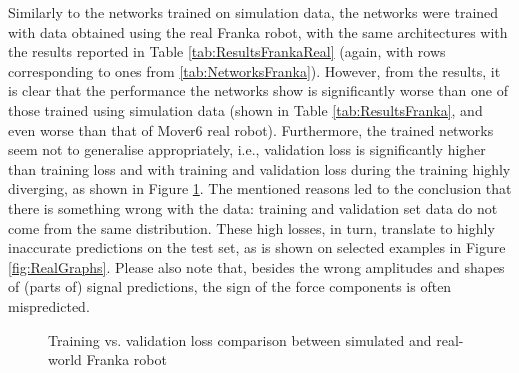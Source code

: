 Similarly to the networks trained on simulation data, the networks were trained with data obtained using the real Franka robot, with the same architectures with the results reported in Table \ref{tab:ResultsFrankaReal} (again, with rows corresponding to ones from \cref{tab:NetworksFranka}). However, from the results, it is clear that the performance the networks show is significantly worse than one of those trained using simulation data (shown in Table \ref{tab:ResultsFranka}, and even worse than that of Mover6 real robot). Furthermore, the trained networks seem not to generalise appropriately, i.e., validation loss is significantly higher than training loss and with training and validation loss during the training highly diverging, as shown in Figure \ref{fig:HistSimVsReal}. The mentioned reasons led to the conclusion that there is something wrong with the data: training and validation set data do not come from the same distribution. These high losses, in turn, translate to highly inaccurate predictions on the test set, as is shown on selected examples in Figure \ref{fig:RealGraphs}. Please also note that, besides the wrong amplitudes and shapes of (parts of) signal predictions, the sign of the force components is often mispredicted. 

\begin{figure}
    \centering
    \hfill
    \caption{Training vs. validation loss comparison between simulated and real-world Franka robot}
    \label{fig:HistSimVsReal}
\end{figure}

